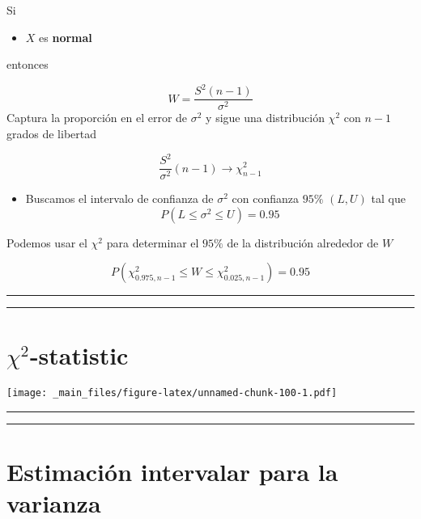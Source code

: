 \documentclass[
]{book}
\providecommand{\tightlist}{%
  \setlength{\itemsep}{0pt}\setlength{\parskip}{0pt}}
\begin{document}
Si

\begin{itemize}
\tightlist
\item
  \(X\) es \textbf{normal}
\end{itemize}

entonces

\[W=\frac{S^2(n-1)}{\sigma^2}\]
Captura la proporción en el error de \(\sigma^2\) y
sigue una distribución \(\chi^2\) con \(n-1\) grados de libertad

\[\frac{S^2}{\sigma^2}(n-1)\rightarrow \chi^2_{n-1}\]

\begin{itemize}
\tightlist
\item
  Buscamos el intervalo de confianza de \(\sigma^2\) con confianza \(95\%\) \((L,U)\) tal que \[P(L \leq \sigma^2 \leq U)=0.95\]
\end{itemize}

Podemos usar el \(\chi^2\) para determinar el \(95\%\) de la distribución alrededor de \(W\)

\[P(\chi^2_{0.975,n-1} \leq W \leq \chi^2_{0.025,n-1})=0.95\]

\begin{center}\rule{0.5\linewidth}{0.5pt}\end{center}

\begin{center}\rule{0.5\linewidth}{0.5pt}\end{center}

\hypertarget{chi2-statistic}{%
\section{\texorpdfstring{\(\chi^2\)-statistic}{\textbackslash chi\^{}2-statistic}}\label{chi2-statistic}}

\texttt{[image: \_main\_files/figure-latex/unnamed-chunk-100-1.pdf]}

\begin{center}\rule{0.5\linewidth}{0.5pt}\end{center}

\begin{center}\rule{0.5\linewidth}{0.5pt}\end{center}

\hypertarget{estimaciuxf3n-intervalar-para-la-varianza-2}{%
\section{Estimación intervalar para la varianza}\label{estimaciuxf3n-intervalar-para-la-varianza-2}}
\end{document}
